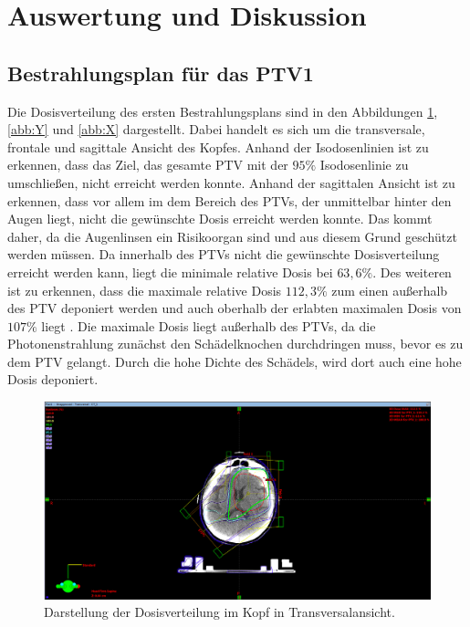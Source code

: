 \section{Auswertung und Diskussion}
\label{sec:Auswertung}

\subsection*{Bestrahlungsplan für das PTV1}

Die Dosisverteilung des ersten Bestrahlungsplans sind in den Abbildungen \ref{abb:Z}, \ref{abb:Y} und \ref{abb:X}
dargestellt. Dabei handelt es sich um die transversale, frontale und sagittale Ansicht des Kopfes.
Anhand der Isodosenlinien ist zu erkennen, dass das Ziel, das gesamte PTV mit der
$95\%$ Isodosenlinie zu umschließen, nicht erreicht werden konnte. Anhand der sagittalen Ansicht ist
zu erkennen, dass vor allem im dem Bereich des PTVs, der unmittelbar hinter den Augen liegt, nicht die gewünschte
Dosis erreicht werden konnte. Das kommt daher, da die Augenlinsen ein Risikoorgan sind und aus diesem Grund geschützt werden müssen.
Da innerhalb des PTVs nicht die gewünschte Dosisverteilung erreicht werden kann, liegt die minimale relative Dosis bei $63,6\%$.
Des weiteren ist zu erkennen, dass die maximale relative Dosis $112,3\%$ zum einen außerhalb des PTV deponiert werden und auch oberhalb der erlabten
maximalen Dosis von $107\%$ liegt \cite{ICRU}. Die maximale Dosis liegt außerhalb des PTVs, da die Photonenstrahlung zunächst den Schädelknochen
durchdringen muss, bevor es zu dem PTV gelangt. Durch die hohe Dichte des Schädels, wird dort auch eine hohe Dosis deponiert.


\begin{figure}[H]
  \centering
  \includegraphics[width=\textwidth]{Bilder/Teilhirn1_Z.png}
  \caption{Darstellung der Dosisverteilung im Kopf in Transversalansicht.}
  \label{abb:Z}
\end{figure}

